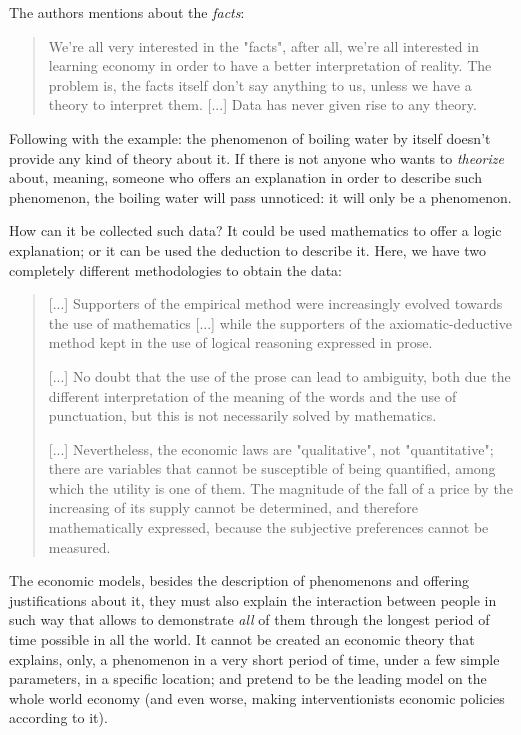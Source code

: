 \documentclass[12pt,a4paper,twoside]{book}
\begin{document}
The authors mentions about the \textit{facts}:

\begin{quotation}
We're all very interested in the "facts", after all, we're all interested in learning economy in order to have a better interpretation of reality. The problem is, the facts itself don't say anything to us, unless we have a theory to interpret them. [...] Data has never given rise to any theory. \cite[p. 28]{elementos-econopol}
\end{quotation}

Following with the example: the phenomenon of boiling water by itself doesn't provide any kind of theory about it. If there is not anyone who wants to \textit{theorize} about, meaning, someone who offers an explanation in order to describe such phenomenon, the boiling water will pass unnoticed: it will only be a phenomenon.

How can it be collected such data? It could be used mathematics to offer a logic explanation; or it can be used the deduction to describe it. Here, we have two completely different methodologies to obtain the data:

\begin{quotation}
[...] Supporters of the empirical method were increasingly evolved towards the use of mathematics [...] while the supporters of the axiomatic-deductive method kept in the use of logical reasoning expressed in prose.

[...] No doubt that the use of the prose can lead to ambiguity, both due the different interpretation of the meaning of the words and the use of punctuation, but this is not necessarily solved by mathematics.

[...] Nevertheless, the economic laws are "qualitative", not "quantitative"; there are variables that cannot be susceptible of being quantified, among which the utility is one of them. The magnitude of the fall of a price by the increasing of its supply cannot be determined, and therefore mathematically expressed, because the subjective preferences cannot be measured. \cite[p. 26-27]{elementos-econopol}
\end{quotation}

The economic models, besides the description of phenomenons and offering justifications about it, they must also explain the interaction between people in such way that allows to demonstrate \textit{all} of them through the longest period of time possible in all the world. It cannot be created an economic theory that explains, only, a phenomenon in a very short period of time, under a few simple parameters, in a specific location; and pretend to be the leading model on the whole world economy (and even worse, making interventionists economic policies according to it).
\end{document}
